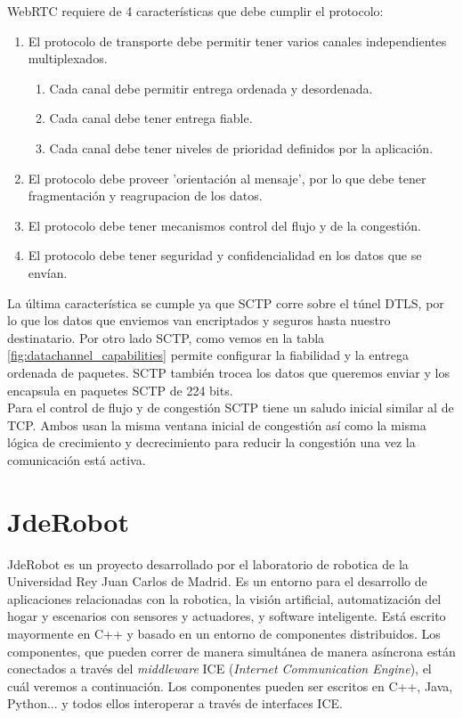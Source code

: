 \noindent WebRTC requiere de 4 características que debe cumplir el protocolo:

\begin{enumerate}
\item El protocolo de transporte debe permitir tener varios canales independientes multiplexados.
\begin{enumerate}
\item Cada canal debe permitir entrega ordenada y desordenada.
\item Cada canal debe tener entrega fiable.
\item Cada canal debe tener niveles de prioridad definidos por la aplicación.
\end{enumerate}
\item El protocolo debe proveer 'orientación al mensaje', por lo que debe tener fragmentación y reagrupacion de los datos.
\item El protocolo debe tener mecanismos control del flujo y de la congestión.
\item El protocolo debe tener seguridad y confidencialidad en los datos que se envían.
\end{enumerate}

La última característica se cumple ya que SCTP corre sobre el túnel DTLS, por lo que los datos que enviemos van encriptados y seguros hasta nuestro destinatario. Por otro lado SCTP, como vemos en la tabla \ref{fig:datachannel_capabilities} permite configurar la fiabilidad y la entrega ordenada de paquetes. SCTP también trocea los datos que queremos enviar y los encapsula en paquetes SCTP de 224 bits.\\

Para el control de flujo y de congestión SCTP tiene un saludo inicial similar al de TCP. Ambos usan la misma ventana inicial de congestión así como la misma lógica de crecimiento y decrecimiento para reducir la congestión una vez la comunicación está activa.\\


\section{JdeRobot}

JdeRobot es un proyecto desarrollado por el laboratorio de robotica de la Universidad Rey Juan Carlos de Madrid. Es un entorno para el desarrollo de aplicaciones relacionadas con la robotica, la visión artificial, automatización del hogar y escenarios con sensores y actuadores, y software inteligente. Está escrito mayormente en C++ y basado en un entorno de componentes distribuidos. Los componentes, que pueden correr de manera simultánea de manera asíncrona están conectados a través del \emph{middleware} ICE (\emph{Internet Communication Engine}), el cuál veremos a continuación. Los componentes pueden ser escritos en C++, Java, Python... y todos ellos interoperar a través de interfaces ICE.\\

